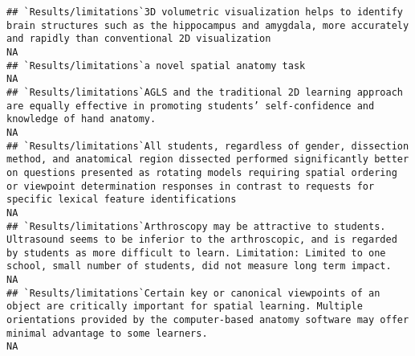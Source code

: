 \documentclass[]{article}
\begin{document}
\begin{verbatim}
## `Results/limitations`3D volumetric visualization helps to identify brain structures such as the hippocampus and amygdala, more accurately and rapidly than conventional 2D visualization                                                                                                                                                                                                                                                                                                NA
## `Results/limitations`a novel spatial anatomy task                                                                                                                                                                                                                                                                                                                                                                                                                                       NA
## `Results/limitations`AGLS and the traditional 2D learning approach are equally effective in promoting students’ self-confidence and knowledge of hand anatomy.                                                                                                                                                                                                                                                                                                                          NA
## `Results/limitations`All students, regardless of gender, dissection method, and anatomical region dissected performed significantly better on questions presented as rotating models requiring spatial ordering or viewpoint determination responses in contrast to requests for specific lexical feature identifications                                                                                                                                                               NA
## `Results/limitations`Arthroscopy may be attractive to students. Ultrasound seems to be inferior to the arthroscopic, and is regarded by students as more difficult to learn. Limitation: Limited to one school, small number of students, did not measure long term impact.                                                                                                                                                                                                             NA
## `Results/limitations`Certain key or canonical viewpoints of an object are critically important for spatial learning. Multiple orientations provided by the computer-based anatomy software may offer minimal advantage to some learners.                                                                                                                                                                                                                                                NA

\end{verbatim}
\end{document}
